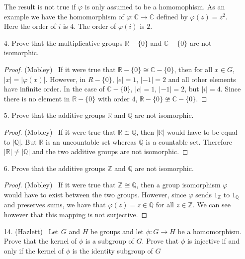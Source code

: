 \documentclass[10pt]{article}
\newcommand{\R}{\mathbb{R}}
\newcommand{\C}{\mathbb{C}}
\newcommand{\Z}{\mathbb{Z}}
\newcommand{\Q}{\mathbb{Q}}
\begin{document}
\begin{itemize}
The result is not true if $\varphi$ is only assumed to be a homomophism.  As an example we have the homomorphism of $\varphi:\C\rightarrow\C$ defined
by $\varphi(z)=z^{2}$.  Here the order of $i$ is $4$.  The order of $\varphi(i)$ is $2$.

\item[4.]  Prove that the multiplicative groups $\R-\lbrace 0 \rbrace $ and $\C-\lbrace 0 \rbrace$ are not isomorphic.

\begin{proof}(Mobley) \ If it were true that $\R-\lbrace 0 \rbrace \cong \C-\lbrace 0 \rbrace$, then for all $x \in G$, $|x|=|\varphi (x)|$.  However, in
$R-\lbrace 0 \rbrace$, $|e|=1$, $|-1|=2$ and all other elements have infinite order.  In the case of $\C-\lbrace 0 \rbrace$, $|e|=1$, $|-1|=2$, but
$|i|=4$.  Since there is no element in $\R-\lbrace 0 \rbrace$ with order $4$, $\R-\lbrace 0 \rbrace \ncong \C-\lbrace 0 \rbrace$.

\end{proof}

\item[5.]  Prove that the additive groups $\R$ and $\mathbb{Q}$ are not isomorphic.

\begin{proof} (Mobley) \ If it were true that $\R \cong \mathbb{Q}$, then $|\R|$ would have to be equal to $|\mathbb{Q}|$.  But $\R$ is an uncountable
set whereas $\mathbb{Q}$ is a countable set.  Therefore $|\R|\neq |\mathbb{Q}|$ and the two additive groups are not isomorphic.

\end{proof}

\item[6.]  Prove that the additive groups $\Z$ and $\mathbb{Q}$ are not isomorphic.

\begin{proof} (Mobley) \ If it were true that $\Z \cong \mathbb{Q}$, then a group
isomorphism $\varphi$ would have to exist between the two groups.  However,  
since $\varphi$ sends $1_\Z$ to $1_\Q$ and preserves sums, we have that 
$\varphi(z) = z \in \mathbb{Q}$ for all $z \in \Z$.
We can see however that this mapping is not surjective. 
\end{proof}

\item[14.] (Hazlett) \ Let $G$ and $H$ be groups and let $\phi : G \to H$ be a homomorphism.  Prove that the kernel of $\phi$ is a subgroup of $G$.  Prove that $\phi$ is injective if and only if the kernel of $\phi$ is the identity subgroup of $G$


\end{itemize}
\end{document}
